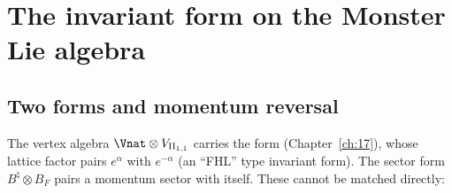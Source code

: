 \section{The invariant form on the Monster Lie algebra}\label{ch18:sec:form}

\subsection{Two forms and momentum reversal}

The vertex algebra $\Vnat\otimes V_{\chXVIIIII}$ carries the form 
(Chapter~\ref{ch:17}), whose lattice factor pairs $e^\alpha$ with $e^{-\alpha}$ (an ``FHL'' type invariant form).  The sector
form $B^\natural\otimes B_F$ pairs a momentum sector with itself.  These cannot be matched directly:

